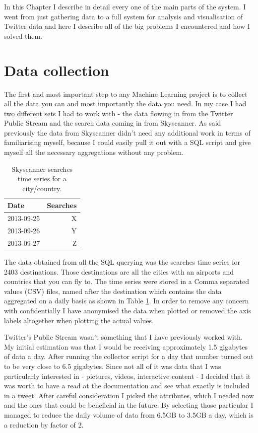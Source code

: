\documentclass[minf,twoside,singlespacing,parskip,frontabs,notimes,11pt]{infthesis}
\begin{document}
In this Chapter I describe in detail every one of the main parts of the system. I went from just gathering data to a full system for analysis and visualisation of Twitter data and here I describe all of the big problems I encountered and how I solved them.


\section{Data collection}
\label{sec:dc}


The first and most important step to any Machine Learning project is to collect all the data you can and most importantly the data you need. In my case I had two different sets I had to work with - the data flowing in from the Twitter Public Stream and the search data coming in from Skyscanner. As said previously the data from Skyscanner didn't need any additional work in terms of familiarising myself, because I could easily pull it out with a SQL script and give myself all the necessary aggregations without any problem. 

\begin{table}[h]
\begin{center}
\begin{tabular}{ l | r }
\textbf{Date} & \textbf{Searches}\\
\hline
2013-09-25 &  X \\
2013-09-26 &  Y \\
2013-09-27 &  Z \\
\end{tabular}
\end{center}
\caption{Skyscanner searches time series for a city/country.}
\label{ssearches}
\end{table}



The data obtained from all the SQL querying was the searches time series for 2403 destinations. Those destinations are all the cities with an airports and countries that you can fly to. The time series were stored in a Comma separated values (CSV) files, named after the destination which contains the data aggregated on a daily basis as shown in Table \ref{ssearches}. In order to remove any concern with confidentially I have anonymised the data when plotted or removed the axis labels altogether when plotting the actual values.


Twitter's Public Stream wasn't something that I have previously worked with. My initial estimation was that I would be receiving approximately 1.5 gigabytes of data a day. After running the collector script for a day that number turned out to be very close to 6.5 gigabytes. Since not all of it was data that I was particularly interested in - pictures, videos, interactive content - I decided that it was worth to have a read at the documentation and see what exactly is included in a tweet\cite{tweetobject}.  After careful consideration I picked the attributes, which I needed now and the ones that could be beneficial in the future. By selecting those particular I managed to reduce the daily volume of data from 6.5GB to 3.5GB a day, which is a reduction by factor of 2.
\end{document}
